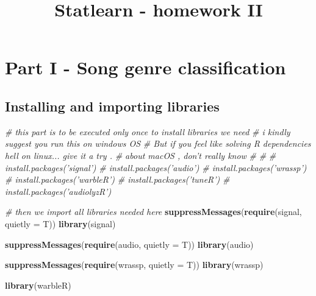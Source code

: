 \documentclass[]{article}
\title{Statlearn - homework II}
\author{}
\date{}
\newenvironment{Shaded}{\begin{snugshade}}{\end{snugshade}}
\newcommand{\KeywordTok}[1]{\textcolor[rgb]{0.13,0.29,0.53}{\textbf{#1}}}
\newcommand{\DataTypeTok}[1]{\textcolor[rgb]{0.13,0.29,0.53}{#1}}
\newcommand{\CommentTok}[1]{\textcolor[rgb]{0.56,0.35,0.01}{\textit{#1}}}
\newcommand{\NormalTok}[1]{#1}
\begin{document}
\maketitle

\section{Part I - Song genre
classification}\label{part-i---song-genre-classification}

\subsection{Installing and importing
libraries}\label{installing-and-importing-libraries}

\begin{Shaded}
\begin{Highlighting}[]
\CommentTok{# this part is to be executed only once to install libraries we need }
\CommentTok{# i kindly suggest you run this on windows OS}
\CommentTok{# But if you feel like  solving R dependencies hell on linux... give it a try .}
\CommentTok{# about macOS , don't really know}
\CommentTok{# }
\CommentTok{# }
\CommentTok{# install.packages('signal')}
\CommentTok{# install.packages('audio')}
\CommentTok{# install.packages('wrassp')}
\CommentTok{# install.packages('warbleR')}
\CommentTok{# install.packages('tuneR')}
\CommentTok{# install.packages('audiolyzR')}
\end{Highlighting}
\end{Shaded}

\begin{Shaded}
\begin{Highlighting}[]
\CommentTok{# then we import all libraries needed here}
\KeywordTok{suppressMessages}\NormalTok{(}\KeywordTok{require}\NormalTok{(signal, }\DataTypeTok{quietly =}\NormalTok{ T))}
\KeywordTok{library}\NormalTok{(signal)}

\KeywordTok{suppressMessages}\NormalTok{(}\KeywordTok{require}\NormalTok{(audio, }\DataTypeTok{quietly =}\NormalTok{ T)) }
\KeywordTok{library}\NormalTok{(audio)}

\KeywordTok{suppressMessages}\NormalTok{(}\KeywordTok{require}\NormalTok{(wrassp,  }\DataTypeTok{quietly =}\NormalTok{ T))}
\KeywordTok{library}\NormalTok{(wrassp)}


\KeywordTok{library}\NormalTok{(warbleR)}
\end{Highlighting}
\end{Shaded}
\end{document}
